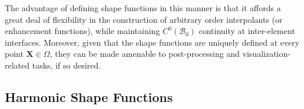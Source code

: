 	
	The advantage of defining shape functions in this manner is that it affords a great deal of flexibility in the construction of arbitrary order interpolants (or enhancement functions), while maintaining $C^0 (\mathcal{B}_0)$ continuity at inter-element interfaces. Moreover, given that the shape functions are uniquely defined at every point $\mathbf{X} \in \Omega$, they can be made amenable to post-processing and visualization-related tasks, if so desired.
	

\subsection*{Harmonic Shape Functions}


